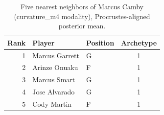 \begin{table}[htbp]
  \centering\small
  \begin{tabular}{rllc}
    \toprule
    Rank & Player & Position & Archetype \\
    \midrule
    1 & Marcus Garrett & G & 1 \\
    2 & Arinze Onuaku & F & 1 \\
    3 & Marcus Smart & G & 1 \\
    4 & Jose Alvarado & G & 1 \\
    5 & Cody Martin & F & 1 \\
    \bottomrule
  \end{tabular}
  \caption{Five nearest neighbors of Marcus Camby (curvature_m4 modality), Procrustes-aligned posterior mean.}
  \label{tab:Marcus_Camby_neighbors_curvature_m4}
\end{table}

